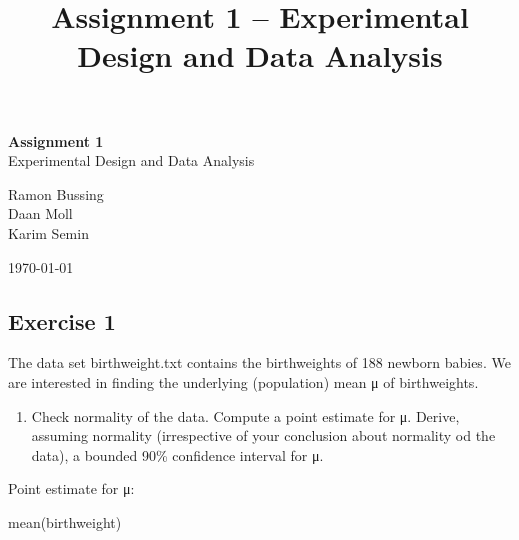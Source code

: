 \documentclass[
]{article}
\title{Assignment 1 -- Experimental Design and Data Analysis}
\author{}
\date{\vspace{-2.5em}}
\newenvironment{Shaded}{\begin{snugshade}}{\end{snugshade}}
\newcommand{\FunctionTok}[1]{\textcolor[rgb]{0.00,0.00,0.00}{#1}}
\newcommand{\NormalTok}[1]{#1}
\providecommand{\tightlist}{%
  \setlength{\itemsep}{0pt}\setlength{\parskip}{0pt}}
\begin{document}
\maketitle



\begin{center}
\LARGE{\textbf{Assignment 1}}\\
\normalsize{Experimental Design and Data Analysis}\\
\vspace*{2\baselineskip}

\vspace*{2\baselineskip}
\Large{Ramon Bussing}\\
\Large{Daan Moll}\\
\Large{Karim Semin}\\
\vspace*{3\baselineskip}

\vspace*{2\baselineskip}

\today
\end{center}

\doublespacing

\hypersetup{linkcolor = black}
\newpage
{}
\newpage

\hypertarget{exercise-1}{%
\subsection{Exercise 1}\label{exercise-1}}

The data set birthweight.txt contains the birthweights of 188 newborn
babies. We are interested in finding the underlying (population) mean μ
of birthweights.

\begin{enumerate}
\def\labelenumi{\alph{enumi})}
\tightlist
\item
  Check normality of the data. Compute a point estimate for μ. Derive,
  assuming normality (irrespective of your conclusion about normality od
  the data), a bounded 90\% confidence interval for μ.
\end{enumerate}

Point estimate for μ:

\begin{Shaded}
\begin{Highlighting}[]
\FunctionTok{mean}\NormalTok{(birthweight)}
\end{Highlighting}
\end{Shaded}
\end{document}
